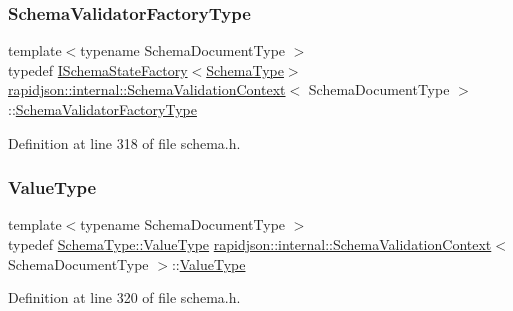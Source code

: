 \subsubsection{\texorpdfstring{SchemaValidatorFactoryType}{SchemaValidatorFactoryType}}
{\footnotesize\ttfamily template$<$typename Schema\+Document\+Type $>$ \\
typedef \mbox{\hyperlink{classrapidjson_1_1internal_1_1_i_schema_state_factory}{I\+Schema\+State\+Factory}}$<$\mbox{\hyperlink{structrapidjson_1_1internal_1_1_schema_validation_context_ae7fc7012fdcdb1b0141b73842c814644}{Schema\+Type}}$>$ \mbox{\hyperlink{structrapidjson_1_1internal_1_1_schema_validation_context}{rapidjson\+::internal\+::\+Schema\+Validation\+Context}}$<$ Schema\+Document\+Type $>$\+::\mbox{\hyperlink{structrapidjson_1_1internal_1_1_schema_validation_context_a1065fcde55a4928092fd576743e68e99}{Schema\+Validator\+Factory\+Type}}}



Definition at line 318 of file schema.\+h.

\mbox{\label{structrapidjson_1_1internal_1_1_schema_validation_context_a8089ea7252f656960c85a840c3f7e311}} 
\subsubsection{\texorpdfstring{ValueType}{ValueType}}
{\footnotesize\ttfamily template$<$typename Schema\+Document\+Type $>$ \\
typedef \mbox{\hyperlink{classrapidjson_1_1internal_1_1_schema_a3979a9083c598195927c08c6e3ba91d1}{Schema\+Type\+::\+Value\+Type}} \mbox{\hyperlink{structrapidjson_1_1internal_1_1_schema_validation_context}{rapidjson\+::internal\+::\+Schema\+Validation\+Context}}$<$ Schema\+Document\+Type $>$\+::\mbox{\hyperlink{structrapidjson_1_1internal_1_1_schema_validation_context_a8089ea7252f656960c85a840c3f7e311}{Value\+Type}}}



Definition at line 320 of file schema.\+h.



